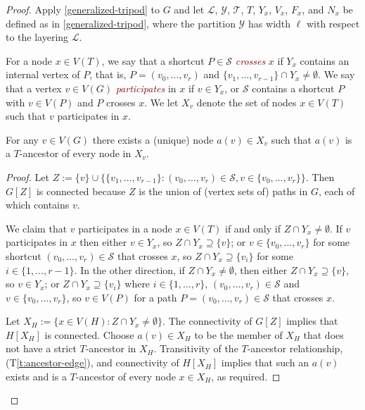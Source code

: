 \documentclass{patmorin}
\newcommand{\defin}[1]{\textcolor{Maroon}{\emph{#1}}}
\newcommand{\tref}[1]{(T\ref{t:#1})}
\renewcommand{\SS}{\mathcal{S}}
\begin{document}
\begin{proof}
Apply \cref{generalized-tripod} to $G$ and let $\mathcal{L}$, $\mathcal{Y}$, $\mathcal{T}$, $T$, $Y_x$, $V_x$, $F_x$, and $N_x$ be defined as in \cref{generalized-tripod}, where the partition $\mathcal{Y}$ has width $\ell$ with respect to the layering $\mathcal{L}$.

For a node $x\in V(T)$, we say that a shortcut $P\in\SS$ \defin{crosses} $x$ if $Y_x$ contains an internal vertex of $P$, that is, $P=(v_0,\ldots,v_r)$ and $\{v_1,\ldots,v_{r-1}\}\cap Y_x\neq\emptyset$.  We say that a vertex $v\in V(G)$ \defin{participates} in $x$ if $v\in Y_x$, or $\SS$ contains a shortcut $P$ with $v\in V(P)$ and $P$ crosses $x$. We let $X_v$ denote the set of nodes $x\in V(T)$ such that $v$ participates in $x$.

\begin{clm}\label{x-v-ancestor}
  For any $v\in V(G)$ there exists a (unique) node $a(v)\in X_v$ such that
  $a(v)$ is a $T$-ancestor of every node in $X_v$.
\end{clm}

\begin{proof}
  Let $Z := \{v\} \cup \{\{v_1,\ldots,v_{r-1}\}:(v_0,\ldots,v_r)\in\SS, v\in \{v_0,\ldots,v_r\}\}$. Then $G[Z]$ is connected because $Z$ is the union of (vertex sets of) paths in $G$, each of which contains $v$.

  We claim that $v$ participates in a node $x\in V(T)$ if and only if $Z\cap Y_x\neq\emptyset$.  If $v$ participates in $x$ then either $v\in Y_x$, so $Z\cap Y_x\supseteq\{v\}$; or $v\in \{v_0,\ldots,v_r\}$ for some shortcut $(v_0,\ldots,v_r)\in\SS$ that crosses $x$, so $Z\cap Y_x\supseteq \{v_i\}$ for some $i\in\{1,\ldots,r-1\}$.  In the other direction, if $Z\cap Y_x\neq\emptyset$, then either $Z\cap Y_x\supseteq \{v\}$, so $v\in Y_x$; or $Z\cap Y_x\supseteq \{v_i\}$ where $i\in\{1,\ldots,r\}$, $(v_0,\ldots,v_r)\in\SS$ and $v\in\{v_0,\ldots,v_r\}$, so $v\in V(P)$ for a path $P=(v_0,\ldots,v_r)\in\SS$ that crosses $x$.

  Let $X_H:=\{x\in V(H): Z\cap Y_x\neq\emptyset\}$.  The connectivity of $G[Z]$ implies that $H[X_H]$ is connected.
  Choose $a(v)\in X_H$ to be the member of $X_H$ that does not have a strict $T$-ancestor in $X_H$.  Transitivity of the $T$-ancestor relationship, \tref{ancestor-edge}, and connectivity of $H[X_H]$ implies that such an $a(v)$ exists and is a $T$-ancestor of every node $x\in X_H$, as required.
\end{proof}


\end{proof}
\end{document}
